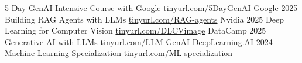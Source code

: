 
\def\mystr{3em}




\begin{cvhonors}

\cvhonor
   {5-Day GenAI Intensive Course with Google}    %
   {
        \hfill
        \href{https://www.kaggle.com/certification/badges/seali33/96}{tinyurl.com/5DayGenAI}
        \hspace{\mystr}
   }
   {Google}      %
   {2025}    %
\cvhonor
   {Building RAG Agents with LLMs}    %
   {
        \hfill
        \href{https://learn.nvidia.com/certificates?id=_YzkKBj9QJiD-pqJ-hFLdg}{tinyurl.com/RAG-agents}
        \hspace{\mystr}
   }
   {Nvidia}      %
   {2025}    %
\cvhonor
   {Deep Learning for Computer Vision}    %
   {
        \hfill
        \href{https://www.datacamp.com/statement-of-accomplishment/course/1961cfcf80c3faab26f009fe3a5938fd352f8f7e?raw=1}{tinyurl.com/DLCVimage}
        \hspace{\mystr}
   }
   {DataCamp}      %
   {2025}    %
\cvhonor
   {Generative AI with LLMs}    %
   {
        \hfill
        \href{https://www.coursera.org/account/accomplishments/verify/GJ8B2ZK8NAXL}{tinyurl.com/LLM-GenAI}
        \hspace{\mystr}
   }
   {DeepLearning.AI}      %
   {2024}    %
\cvhonor
   {Machine Learning Specialization}    %
   {
        \hfill
        \href{https://www.coursera.org/account/accomplishments/specialization/UED4Q5KFZZM8}{tinyurl.com/ML-specialization}
        \hspace{\mystr}
}
\end{cvhonors}
